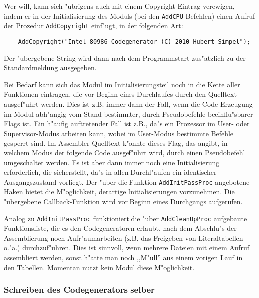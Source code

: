 \documentclass[12pt,a4paper,twoside]{report}
\newcommand{\tty}[1]{{\tt #1}}
\begin{document}
Wer will, kann sich "ubrigens auch mit einem Copyright-Eintrag verewigen,
indem er in der Initialisierung des Moduls (bei den \tty{AddCPU}-Befehlen)
einen Aufruf der Prozedur \tty{AddCopyright} einf"ugt, in der folgenden
Art:
\begin{verbatim}
    AddCopyright("Intel 80986-Codegenerator (C) 2010 Hubert Simpel");
\end{verbatim}
Der "ubergebene String wird dann nach dem Programmstart zus"atzlich zu
der Standardmeldung ausgegeben.

Bei Bedarf kann sich das Modul im Initialisierungsteil noch in die
Kette aller Funktionen eintragen, die vor Beginn eines Durchlaufes
durch den Quelltext ausgef"uhrt werden.  Dies ist z.B. immer dann der
Fall, wenn die Code-Erzeugung im Modul abh"angig vom Stand bestimmter,
durch Pseudobefehle beeinflu"sbarer Flags ist.  Ein h"aufig auftretender
Fall ist z.B., da"s ein Prozessor im User- oder Supervisor-Modus
arbeiten kann, wobei im User-Modus bestimmte Befehle gesperrt
sind.  Im Assembler-Quelltext k"onnte dieses Flag, das angibt, in welchem
Modus der folgende Code ausgef"uhrt wird, durch einen Pseudobefehl
umgeschaltet werden.  Es ist aber dann immer noch eine Initialisierung
erforderlich, die sicherstellt, da"s in allen Durchl"aufen ein identischer
Ausgangszustand vorliegt.  Der "uber die Funktion \tty{AddInitPassProc}
angebotene Haken bietet die M"oglichkeit, derartige Initialisierungen
vorzunehmen.  Die "ubergebene Callback-Funktion wird vor Beginn
eines Durchgangs aufgerufen.

Analog zu \tty{AddInitPassProc} funktioniert die "uber \tty{AddCleanUpProc}
aufgebaute Funktionsliste, die es den Codegeneratoren erlaubt, nach dem
Abschlu"s der Assemblierung noch Aufr"aumarbeiten (z.B. das Freigeben von
Literaltabellen o."a.) durchzuf"uhren.  Dies ist sinnvoll, wenn mehrere
Dateien mit einem Aufruf assembliert werden, sonst h"atte man noch
,,M"ull'' aus einem vorigen Lauf in den Tabellen.  Momentan nutzt kein
Modul diese M"oglichkeit.

\subsubsection{Schreiben des Codegenerators selber}
\end{document}
